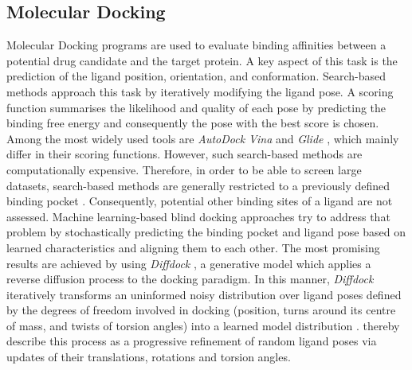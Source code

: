\documentclass[11pt, letterpaper, titlepage]{article}
\renewcommand{\cite}{\parencite}
\begin{document}
\subsection{Molecular Docking}
Molecular Docking programs are used to evaluate binding affinities between a potential drug candidate and the target protein. A key aspect of this task is the prediction of the ligand position, orientation, and conformation. Search-based methods approach this task by iteratively modifying the ligand pose. A scoring function summarises the likelihood and quality of each pose by predicting the binding free energy and consequently the pose with the best score is chosen. Among the most widely used tools are \textit{AutoDock Vina} \cite{Trott.2010} and \textit{Glide} \cite{Halgren.2004}, which mainly differ in their scoring functions. However, such search-based methods are computationally expensive. Therefore, in order to be able to screen large datasets, search-based methods are generally restricted to a previously defined binding pocket \cite{Corso.2022}. Consequently, potential other binding sites of a ligand are not assessed. Machine learning-based blind docking approaches try to address that problem by stochastically predicting the binding pocket and ligand pose based on learned characteristics and aligning them to each other. The most promising results are achieved by using \textit{Diffdock} \cite{Corso.2022}, a generative model which applies a reverse diffusion process to the docking paradigm. In this manner, \textit{Diffdock} iteratively transforms an uninformed noisy distribution over ligand poses defined by the degrees of freedom involved in docking (position, turns around its centre of mass, and twists of torsion angles) into a learned model distribution \cite{Corso.2022}. \citeauthor{Corso.2022} thereby describe this process as a progressive refinement of random ligand poses via updates of their translations, rotations and torsion angles.

\end{document}
